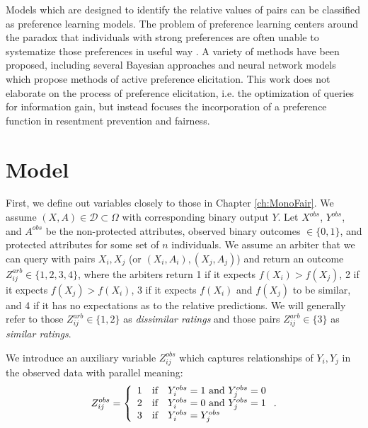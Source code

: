     Models which are designed to identify the relative values of pairs can be classified as preference learning models\cite{peters2018scalable}.  The problem of preference learning centers around the paradox that individuals with strong preferences are often unable to systematize those preferences in useful way \cite{lichtenstein2006construction}.  A variety of methods have been proposed, including several Bayesian approaches\cite{peters2018scalable,guo2010gaussian} and neural network models \cite{duman2019intelligent, khannoussi2019integrating} which propose methods of active preference elicitation.  This work does not elaborate on the process of preference elicitation, i.e. the optimization of queries for information gain, but instead focuses the incorporation of a preference function in resentment prevention and fairness.
    

\section{Model}\label{sec:softmono_model}

    First, we define out variables closely to those in Chapter \ref{ch:MonoFair}.  We assume $(X, A) \in \mathcal{D} \subset \Omega$ with corresponding binary output $Y$.  Let $X^{obs}$, $Y^{obs}$, and $A^{obs}$ be the non-protected attributes, observed binary outcomes $\in \{0, 1\}$, and protected attributes for some set of $n$ individuals.  We assume an arbiter that we can query with pairs $X_i, X_j$ (or $(X_i, A_i), (X_j, A_j)$) and return an outcome $Z_{ij}^{arb} \in \{1, 2, 3, 4\}$, where the arbiters return 1 if it expects $f(X_i) > f(X_j)$, 2 if it expects $f(X_j) > f(X_i)$, 3 if it expects $f(X_i)$ and $f(X_j)$ to be similar, and 4 if it has no expectations as to the relative predictions.  We will generally refer to those $Z_{ij}^{arb} \in \{1, 2\}$ as \emph{dissimilar ratings} and those pairs $Z_{ij}^{arb} \in \{3\}$ as \emph{similar ratings}.
    
    We introduce an auxiliary variable $Z_{ij}^{obs}$ which captures relationships of $Y_i, Y_j$ in the observed data with parallel meaning:
    $$ Z_{ij}^{obs} = \left\{ \begin{array}{l c l}
        1 & \mbox{if} & Y_i^{obs} = 1 \mbox{~and~} Y_j^{obs} = 0 \\
        2 & \mbox{if} & Y_i^{obs} = 0 \mbox{~and~} Y_j^{obs} = 1 \\
        3 & \mbox{if} & Y_i^{obs} = Y_j^{obs}
    \end{array}\right. .$$
    

